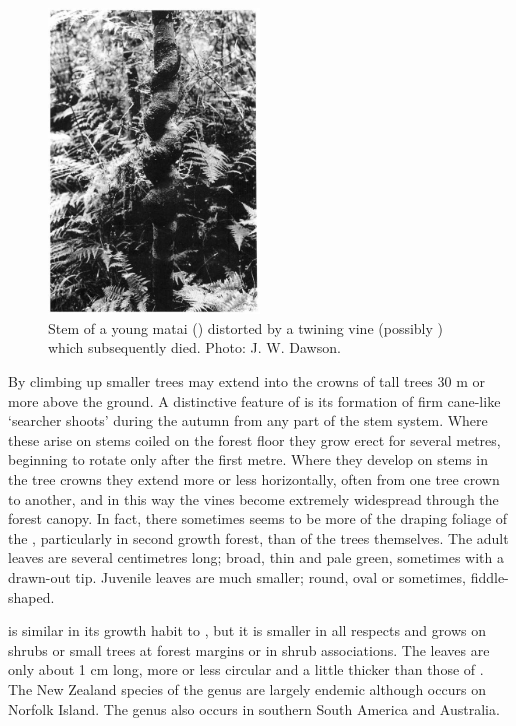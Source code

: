 \begin{figure}
	\includegraphics[width=0.5\textwidth]{graphics/figure35matai.jpg}
	\centering
	\caption[Stem of a young matai]{Stem of a young matai () distorted by a twining vine (possibly ) which subsequently died.
	Photo: J. W. Dawson.}
	\label{fig:35matai}
\end{figure}

By climbing up smaller trees  may extend into the crowns of tall trees 30 m or more above the ground.
A distinctive feature of  is its formation of firm cane-like `searcher shoots' during the autumn from any part of the stem system.
Where these arise on stems coiled on the forest floor they grow erect for several metres, beginning to rotate only after the first metre.
Where they develop on stems in the tree crowns they extend more or less horizontally, often from one tree crown to another, and in this way the vines become extremely widespread through the forest canopy.
In fact, there sometimes seems to be more of the draping foliage of the , particularly in second growth forest, than of the trees themselves.
The adult leaves are several centimetres long; broad, thin and pale green, sometimes with a drawn-out tip.
Juvenile leaves are much smaller; round, oval or sometimes, fiddle-shaped.

 is similar in its growth habit to , but it is smaller in all respects and grows on shrubs or small trees at forest margins or in shrub associations.
The leaves are only about 1 cm long, more or less circular and a little thicker than those of .
The New Zealand species of the genus are largely endemic although  occurs on Norfolk Island.
The genus also occurs in southern South America and Australia.

